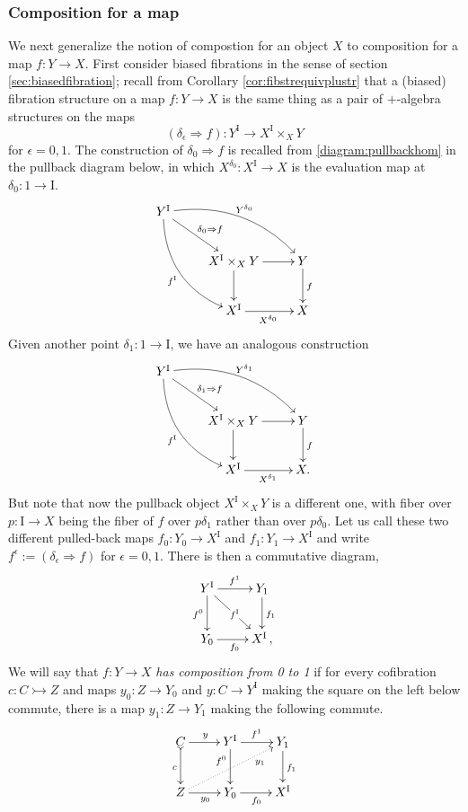 \documentclass[12pt]{article}
\newcommand{\mono}{\ensuremath{\rightarrowtail}}
\newcommand{\ra}{\ensuremath{\rightarrow}}
\newcommand{\I}{\ensuremath{\mathrm{I}}}
\theoremstyle{remark}
\theoremstyle{definition}
\begin{document}
\subsubsection*{Composition for a map}
We next generalize the notion of compostion for an object $X$ to composition for a map $f : Y\ra X$.  First consider biased fibrations in the sense of section \ref{sec:biasedfibration}; recall from Corollary \ref{cor:fibstrequivplustr} that a (biased) fibration structure on a map $f :Y\ra X$ is the same thing as a pair of $+$-algebra structures on the maps
\[
(\delta_\epsilon\Rightarrow\!{f}) : Y^\I \ra X^\I \times_{X} Y
\]
for $\epsilon = 0,1$.  The construction of $\delta_0\Rightarrow\!{f}$ is recalled from \eqref{diagram:pullbackhom} in the pullback diagram below, in which $X^{\delta_0}:X^\I \ra X$ is the evaluation map at $\delta_0 : 1\ra \I$.
\begin{equation}\label{diagram:pullbackhomreview}
\xymatrix{
Y^\I \ar@/_4ex/ [rdd]_{f^\I} \ar[rd]^{\delta_0\Rightarrow{f}} \ar@/^4ex/ [rrd]^{Y^{\delta_0}} && \\
& X^\I \times_{X} Y \ar[d] \ar[r] & Y \ar[d]^{f} \\
& X^\I \ar[r]_{X^{\delta_0}} &  X
}
\end{equation}
%
Given another point $\delta_1 : 1\ra \I$, we have an analogous construction
\begin{equation}\label{diagram:pullbackhomreviewprime}
\xymatrix{
Y^\I \ar@/_4ex/ [rdd]_{f^\I} \ar[rd]^{\delta_1\Rightarrow{f}} \ar@/^4ex/ [rrd]^{Y^{\delta_1}}  && \\
& X^\I \times_{X} Y \ar[d] \ar[r] & Y \ar[d]^{f} \\
& X^\I \ar[r]_{X^{\delta_1}} &  X.
}
\end{equation}
But note that now the pullback object $X^\I \times_{X} Y $ is a different one, with fiber over $p : \I \ra X$ being the fiber of $f$ over $p\delta_1$ rather than over $p\delta_0$.  Let us call these two different pulled-back maps $f_0:Y_0\ra X^\I$ and $f_1:Y_1 \ra X^\I$ and write $f^\epsilon := (\delta_\epsilon\Rightarrow{f})$ for $\epsilon = 0,1$.  There is then a commutative diagram,
%
\begin{equation}\label{diagram:composition3}
\xymatrix{
Y^\I \ar[d]_{f^0} \ar[rd]|{f^\I} \ar[r]^{f^1} & Y_1 \ar[d]^{f_1}\\
Y_0 \ar[r]_{f_0} & X^\I\,,
}
\end{equation}
%
We will say that $f:Y\ra X$ \emph{has composition from 0 to 1} if for every cofibration $c : C\mono Z$ and maps $y_0 : Z\ra Y_0$ and $y : C\ra Y^\I$ making the square on the left below commute, there is a map $y_1 : Z\ra Y_1$ making the following commute.
\begin{equation}\label{diagram:composition4}
\xymatrix{
C \ar@{>->}[d]_{c} \ar[r]^{y} & Y^\I \ar[d]_>>>>>>>{f^0} \ar[r]^{f^1} & Y_1 \ar[d]^{f_1}\\
Z \ar@{..>}[rru]_>>>>>>{y_1} \ar[r]_{y_0} & Y_0 \ar[r]_{f_0} & X^\I
}
\end{equation}
\end{document}
